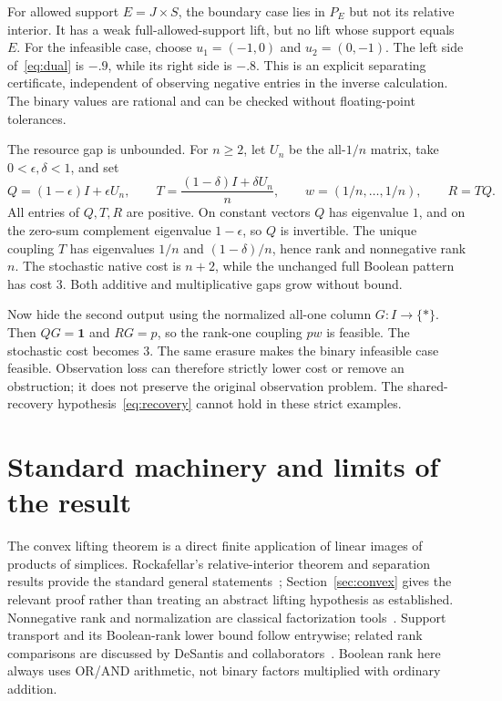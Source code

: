 \documentclass[11pt]{article}
\newcommand{\one}{\mathbf 1}
\theoremstyle{remark}
\begin{document}
For allowed support $E=J\times S$, the boundary case lies in $P_E$ but not its relative interior. It has a weak full-allowed-support lift, but no lift whose support equals $E$. For the infeasible case, choose $u_1=(-1,0)$ and $u_2=(0,-1)$. The left side of~\eqref{eq:dual} is $-.9$, while its right side is $-.8$. This is an explicit separating certificate, independent of observing negative entries in the inverse calculation. The binary values are rational and can be checked without floating-point tolerances.

The resource gap is unbounded. For $n\ge2$, let $U_n$ be the all-$1/n$ matrix, take $0<\epsilon,\delta<1$, and set
\[
 Q=(1-\epsilon)I+\epsilon U_n,\qquad
 T=\frac{(1-\delta)I+\delta U_n}{n},\qquad
 w=(1/n,\ldots,1/n),\qquad R=TQ.
\]
All entries of $Q,T,R$ are positive. On constant vectors $Q$ has eigenvalue $1$, and on the zero-sum complement eigenvalue $1-\epsilon$, so $Q$ is invertible. The unique coupling $T$ has eigenvalues $1/n$ and $(1-\delta)/n$, hence rank and nonnegative rank $n$. The stochastic native cost is $n+2$, while the unchanged full Boolean pattern has cost $3$. Both additive and multiplicative gaps grow without bound.

Now hide the second output using the normalized all-one column $G:I\to\{*\}$. Then $QG=\one$ and $RG=p$, so the rank-one coupling $pw$ is feasible. The stochastic cost becomes $3$. The same erasure makes the binary infeasible case feasible. Observation loss can therefore strictly lower cost or remove an obstruction; it does not preserve the original observation problem. The shared-recovery hypothesis~\eqref{eq:recovery} cannot hold in these strict examples.

\section{Standard machinery and limits of the result}\label{sec:sources}

The convex lifting theorem is a direct finite application of linear images of products of simplices. Rockafellar's relative-interior theorem and separation results provide the standard general statements~\cite{Rockafellar1970}; Section~\ref{sec:convex} gives the relevant proof rather than treating an abstract lifting hypothesis as established. Nonnegative rank and normalization are classical factorization tools~\cite{CohenRothblum1993}. Support transport and its Boolean-rank lower bound follow entrywise; related rank comparisons are discussed by DeSantis and collaborators~\cite{DeSantis2020}. Boolean rank here always uses OR/AND arithmetic, not binary factors multiplied with ordinary addition.
\end{document}
